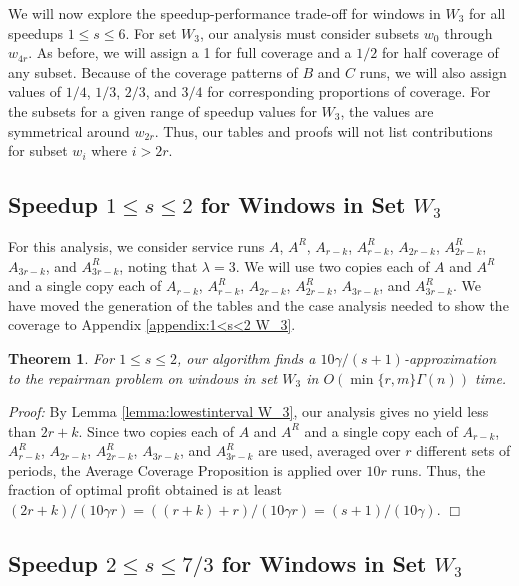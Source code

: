 \documentclass[11pt]{article}
\newtheorem{theorem}{Theorem}[section]
\newcommand\QED{\ifhmode\allowbreak\else\nobreak\fi
\quad\nobreak$\Box$\medbreak}
\newcommand{\proofstart}{\par\noindent \emph{Proof:} }
\newcommand{\proofend}{\QED\par}
\newenvironment{proof}{\proofstart}{\proofend}
\begin{document}
We will now explore the speedup-performance trade-off for windows in $W_3$ for all speedups $1 \leq s \leq 6$.  For set $W_3$, our analysis must consider subsets $w_0$ through $w_{4r}$.  As before, we will assign a 1 for full coverage and a $1/2$ for half coverage of any subset.  Because of the coverage patterns of $B$ and $C$ runs, we will also assign values of $1/4$, $1/3$, $2/3$, and $3/4$ for corresponding proportions of coverage.  For the subsets for a given range of speedup values for $W_3$, the values are symmetrical around $w_{2r}$.  Thus, our tables and proofs will not list contributions for subset $w_i$ where $i > 2r$.

\subsection{Speedup $1 \leq s \leq 2$ for Windows in Set $W_3$}

For this analysis, we consider service runs $A$, $A^R$, $A_{r - k}$, $A_{r - k}^R$, $A_{2r - k}$, $A_{2r - k}^R$, $A_{3r - k}$, and $A_{3r - k}^R$, noting that $\lambda = 3$.  We will use two copies each of $A$ and $A^R$ and a single copy each of $A_{r - k}$, $A_{r - k}^R$, $A_{2r - k}$, $A_{2r - k}^R$, $A_{3r - k}$, and $A_{3r - k}^R$.  We have moved the generation of the tables and the case analysis needed to show the coverage to Appendix \ref{appendix:1<s<2 W_3}.

\begin{theorem}
For $1 \leq s \leq 2$, our algorithm finds a $10\gamma /(s+1)$-approximation to the repairman problem on windows in set $W_3$ in $O(\min\{r, m\}\Gamma(n))$ time.
\end{theorem}

\begin{proof}
By Lemma \ref{lemma:lowestinterval W_3}, our analysis gives no yield less than $2r + k$.  Since two copies each of $A$ and $A^R$ and a single copy each of $A_{r - k}$, $A_{r - k}^R$, $A_{2r - k}$, $A_{2r - k}^R$, $A_{3r - k}$, and $A_{3r - k}^R$ are used, averaged over $r$ different sets of periods, the Average Coverage Proposition is applied over $10r$ runs.  Thus, the fraction of optimal profit obtained is at least ${(2r + k)/(10\gamma r)} = {((r + k) + r)/(10\gamma r)} = {(s + 1)/(10\gamma)}$.
\end{proof}

\subsection{Speedup $2 \leq s \leq 7/3$ for Windows in Set $W_3$}
\end{document}
